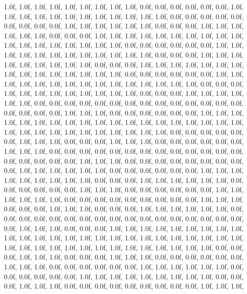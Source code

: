 {   1.0f, 1.0f, 1.0f,   1.0f, 1.0f, 1.0f,   1.0f, 1.0f, 1.0f,   0.0f, 0.0f, 0.0f,   0.0f, 0.0f, 0.0f,   1.0f, 1.0f, 1.0f,   1.0f, 1.0f, 1.0f,   1.0f, 1.0f, 1.0f,   1.0f, 1.0f, 1.0f,   0.0f, 0.0f, 0.0f,   0.0f, 0.0f, 0.0f,   0.0f, 0.0f, 0.0f,   1.0f, 1.0f, 1.0f,   1.0f, 1.0f, 1.0f,   0.0f, 0.0f, 0.0f,   1.0f, 1.0f, 1.0f,   1.0f, 1.0f, 1.0f,   0.0f, 0.0f, 0.0f,   1.0f, 1.0f, 1.0f,   1.0f, 1.0f, 1.0f,   1.0f, 1.0f, 1.0f,   1.0f, 1.0f, 1.0f,   1.0f, 1.0f, 1.0f,   1.0f, 1.0f, 1.0f,   0.0f, 0.0f, 0.0f,   0.0f, 0.0f, 0.0f,   1.0f, 1.0f, 1.0f,   1.0f, 1.0f, 1.0f,   1.0f, 1.0f, 1.0f,   1.0f, 1.0f, 1.0f,   0.0f, 0.0f, 0.0f,   1.0f, 1.0f, 1.0f,   
   1.0f, 1.0f, 1.0f,   1.0f, 1.0f, 1.0f,   0.0f, 0.0f, 0.0f,   1.0f, 1.0f, 1.0f,   1.0f, 1.0f, 1.0f,   1.0f, 1.0f, 1.0f,   1.0f, 1.0f, 1.0f,   1.0f, 1.0f, 1.0f,   0.0f, 0.0f, 0.0f,   0.0f, 0.0f, 0.0f,   1.0f, 1.0f, 1.0f,   1.0f, 1.0f, 1.0f,   1.0f, 1.0f, 1.0f,   1.0f, 1.0f, 1.0f,   1.0f, 1.0f, 1.0f,   0.0f, 0.0f, 0.0f,   1.0f, 1.0f, 1.0f,   1.0f, 1.0f, 1.0f,   1.0f, 1.0f, 1.0f,   0.0f, 0.0f, 0.0f,   1.0f, 1.0f, 1.0f,   1.0f, 1.0f, 1.0f,   0.0f, 0.0f, 0.0f,   0.0f, 0.0f, 0.0f,   0.0f, 0.0f, 0.0f,   0.0f, 0.0f, 0.0f,   0.0f, 0.0f, 0.0f,   0.0f, 0.0f, 0.0f,   1.0f, 1.0f, 1.0f,   0.0f, 0.0f, 0.0f,   0.0f, 0.0f, 0.0f,   1.0f, 1.0f, 1.0f,   
   1.0f, 1.0f, 1.0f,   1.0f, 1.0f, 1.0f,   1.0f, 1.0f, 1.0f,   1.0f, 1.0f, 1.0f,   1.0f, 1.0f, 1.0f,   1.0f, 1.0f, 1.0f,   1.0f, 1.0f, 1.0f,   1.0f, 1.0f, 1.0f,   1.0f, 1.0f, 1.0f,   0.0f, 0.0f, 0.0f,   0.0f, 0.0f, 0.0f,   1.0f, 1.0f, 1.0f,   0.0f, 0.0f, 0.0f,   1.0f, 1.0f, 1.0f,   0.0f, 0.0f, 0.0f,   0.0f, 0.0f, 0.0f,   1.0f, 1.0f, 1.0f,   0.0f, 0.0f, 0.0f,   0.0f, 0.0f, 0.0f,   0.0f, 0.0f, 0.0f,   0.0f, 0.0f, 0.0f,   0.0f, 0.0f, 0.0f,   0.0f, 0.0f, 0.0f,   1.0f, 1.0f, 1.0f,   0.0f, 0.0f, 0.0f,   0.0f, 0.0f, 0.0f,   0.0f, 0.0f, 0.0f,   1.0f, 1.0f, 1.0f,   1.0f, 1.0f, 1.0f,   0.0f, 0.0f, 0.0f,   0.0f, 0.0f, 0.0f,   1.0f, 1.0f, 1.0f,   
   1.0f, 1.0f, 1.0f,   1.0f, 1.0f, 1.0f,   0.0f, 0.0f, 0.0f,   1.0f, 1.0f, 1.0f,   1.0f, 1.0f, 1.0f,   0.0f, 0.0f, 0.0f,   0.0f, 0.0f, 0.0f,   1.0f, 1.0f, 1.0f,   0.0f, 0.0f, 0.0f,   0.0f, 0.0f, 0.0f,   1.0f, 1.0f, 1.0f,   1.0f, 1.0f, 1.0f,   0.0f, 0.0f, 0.0f,   0.0f, 0.0f, 0.0f,   0.0f, 0.0f, 0.0f,   1.0f, 1.0f, 1.0f,   0.0f, 0.0f, 0.0f,   1.0f, 1.0f, 1.0f,   0.0f, 0.0f, 0.0f,   1.0f, 1.0f, 1.0f,   1.0f, 1.0f, 1.0f,   0.0f, 0.0f, 0.0f,   0.0f, 0.0f, 0.0f,   0.0f, 0.0f, 0.0f,   0.0f, 0.0f, 0.0f,   0.0f, 0.0f, 0.0f,   0.0f, 0.0f, 0.0f,   1.0f, 1.0f, 1.0f,   0.0f, 0.0f, 0.0f,   1.0f, 1.0f, 1.0f,   1.0f, 1.0f, 1.0f,   1.0f, 1.0f, 1.0f,   
   1.0f, 1.0f, 1.0f,   1.0f, 1.0f, 1.0f,   1.0f, 1.0f, 1.0f,   1.0f, 1.0f, 1.0f,   1.0f, 1.0f, 1.0f,   1.0f, 1.0f, 1.0f,   1.0f, 1.0f, 1.0f,   1.0f, 1.0f, 1.0f,   1.0f, 1.0f, 1.0f,   1.0f, 1.0f, 1.0f,   0.0f, 0.0f, 0.0f,   1.0f, 1.0f, 1.0f,   0.0f, 0.0f, 0.0f,   1.0f, 1.0f, 1.0f,   0.0f, 0.0f, 0.0f,   0.0f, 0.0f, 0.0f,   1.0f, 1.0f, 1.0f,   0.0f, 0.0f, 0.0f,   0.0f, 0.0f, 0.0f,   1.0f, 1.0f, 1.0f,   1.0f, 1.0f, 1.0f,   0.0f, 0.0f, 0.0f,   0.0f, 0.0f, 0.0f,   1.0f, 1.0f, 1.0f,   1.0f, 1.0f, 1.0f,   1.0f, 1.0f, 1.0f,   0.0f, 0.0f, 0.0f,   1.0f, 1.0f, 1.0f,   0.0f, 0.0f, 0.0f,   0.0f, 0.0f, 0.0f,   0.0f, 0.0f, 0.0f,   1.0f, 1.0f, 1.0f,   
}
